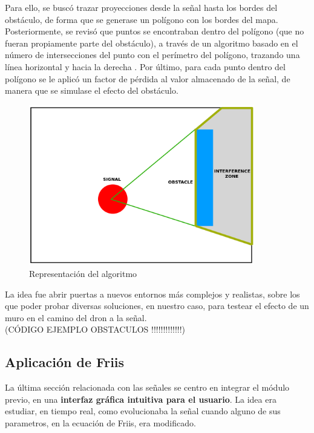 Para ello, se buscó trazar proyecciones desde la señal hasta los bordes del obstáculo, de forma que se generase un polígono con los bordes del mapa. Posteriormente, se revisó que puntos se encontraban dentro del polígono (que no fueran propiamente parte del obstáculo), a través de un algoritmo basado en el número de intersecciones del punto con el perímetro del polígono, trazando una línea horizontal y hacia la derecha \cite{poly-info}. Por último, para cada punto dentro del polígono se le aplicó un factor de pérdida al valor almacenado de la señal, de manera que se simulase el efecto del obstáculo.\\

\begin{figure} [H]
	\begin{center}
	\includegraphics[height=7cm]{imagenes/cap4/5_interference.png}
	\end{center}
	\caption[Representación del algoritmo]{Representación del algoritmo}
	\label{fig:interference_algorithm}
\end{figure}

La idea fue abrir puertas a nuevos entornos más complejos y realistas, sobre los que poder probar diversas soluciones, en nuestro caso, para testear el efecto de un muro en el camino del dron a la señal.\\

(CÓDIGO EJEMPLO OBSTACULOS !!!!!!!!!!!!!)\\

\subsection{Aplicación de Friis}
\label{subsec:friis-app}

La última sección relacionada con las señales se centro en integrar el módulo previo, en una \textbf{interfaz gráfica intuitiva para el usuario}. La idea era estudiar, en tiempo real, como evolucionaba la señal cuando alguno de sus parametros, en la ecuación de Friis, era modificado.\\

